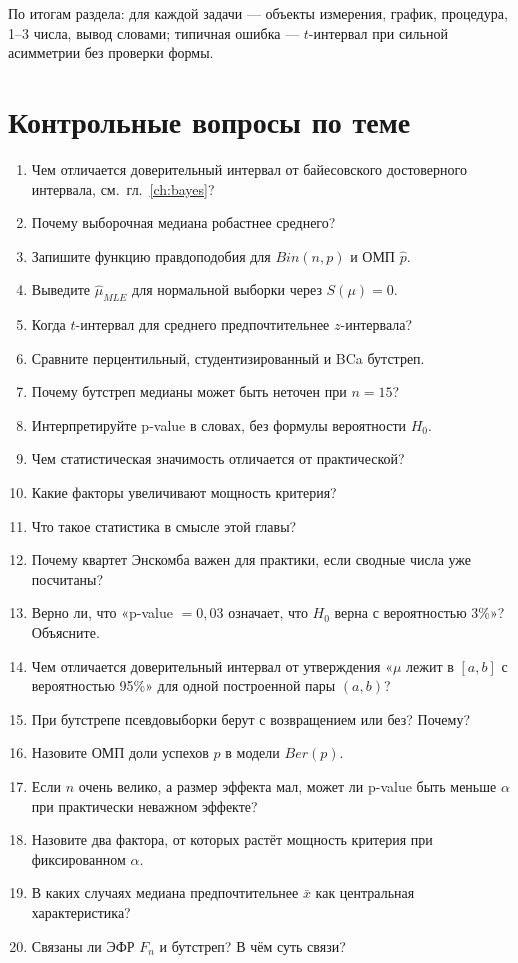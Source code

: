 По итогам раздела: для каждой задачи --- объекты измерения, график, процедура, 1--3 числа, вывод словами; типичная ошибка --- $t$-интервал при сильной асимметрии без проверки формы.

\section{Контрольные вопросы по теме}

\begin{enumerate}
 \item Чем отличается доверительный интервал от байесовского достоверного интервала, см.~гл.~\ref{ch:bayes}?
 \item Почему выборочная медиана робастнее среднего?
 \item Запишите функцию правдоподобия для $Bin(n,p)$ и ОМП $\hat p$.
 \item Выведите $\hat\mu_{MLE}$ для нормальной выборки через $S(\mu)=0$.
 \item Когда $t$-интервал для среднего предпочтительнее $z$-интервала?
 \item Сравните перцентильный, студентизированный и BCa бутстреп.
 \item Почему бутстреп медианы может быть неточен при $n=15$?
 \item Интерпретируйте p-value в словах, без формулы вероятности $H_0$.
 \item Чем статистическая значимость отличается от практической?
 \item Какие факторы увеличивают мощность критерия?
 \item Что такое статистика в смысле этой главы?
 \item Почему квартет Энскомба важен для практики, если сводные числа уже посчитаны?
 \item Верно ли, что «p-value $=0{,}03$ означает, что $H_0$ верна с вероятностью 3\%»? Объясните.
 \item Чем отличается доверительный интервал от утверждения «$\mu$ лежит в $[a,b]$ с вероятностью 95\%» для одной построенной пары $(a,b)$?
 \item При бутстрепе псевдовыборки берут с возвращением или без? Почему?
 \item Назовите ОМП доли успехов $p$ в модели $Ber(p)$.
 \item Если $n$ очень велико, а размер эффекта мал, может ли p-value быть меньше $\alpha$ при практически неважном эффекте?
 \item Назовите два фактора, от которых растёт мощность критерия при фиксированном $\alpha$.
 \item В каких случаях медиана предпочтительнее $\bar x$ как центральная характеристика?
 \item Связаны ли ЭФР $F_n$ и бутстреп? В чём суть связи?
\end{enumerate}
